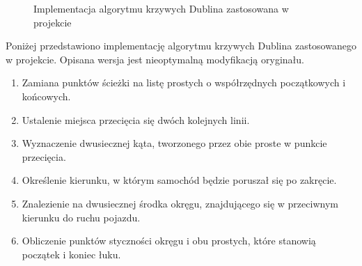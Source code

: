         \begin{wrapfigure}[3]{R}{0.33\textwidth}
            \centering
            \vspace{-1cm}
            \caption{Implementacja algorytmu krzywych Dublina zastosowana w projekcie}
        \end{wrapfigure}

        Poniżej przedstawiono implementację algorytmu krzywych Dublina zastosowanego w projekcie.
        Opisana wersja jest nieoptymalną modyfikacją oryginału.

        \vspace{0.25cm}
        \begin{minipage}[l]{0.6\textwidth}
            \begin{enumerate}
                \item Zamiana punktów ścieżki na listę prostych o współrzędnych początkowych i końcowych.
                \item Ustalenie miejsca przecięcia się dwóch kolejnych linii.
                \item Wyznaczenie dwusiecznej kąta, tworzonego przez obie proste w punkcie przecięcia.
                \item Określenie kierunku, w którym samochód będzie poruszał się po zakręcie.
                \item Znalezienie na dwusiecznej środka okręgu, znajdującego się w przeciwnym kierunku do ruchu pojazdu.
                \item Obliczenie punktów styczności okręgu i obu prostych, które stanowią początek i koniec łuku.
            \end{enumerate}
        \end{minipage}
        \vspace{0.25cm}

